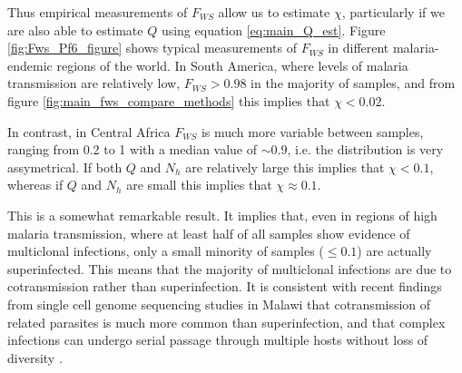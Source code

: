 \documentclass[_main.tex]{subfiles}
\begin{document}
Thus empirical measurements of $F_{WS}$ allow us to estimate $\chi$, particularly if we are also able to estimate $Q$ using equation \ref{eq:main_Q_est}.  Figure \ref{fig:Fws_Pf6_figure} shows typical measurements of $F_{WS}$ in different malaria-endemic regions of the world.  In South America, where levels of malaria transmission are relatively low, $F_{WS} > 0.98$ in the majority of samples, and from figure \ref{fig:main_fws_compare_methods} this implies that $\chi < 0.02$.  

In contrast, in Central Africa $F_{WS}$ is much more variable between samples, ranging from 0.2 to 1 with a median value of $\sim 0.9$, i.e. the distribution is very assymetrical.  If both $Q$ and $N_h$ are relatively large this implies that $\chi < 0.1$, whereas if $Q$ and $N_h$ are small this implies that $\chi \approx 0.1$. 

This is a somewhat remarkable result.  It implies that, even in regions of high malaria transmission, where at least half of all samples show evidence of multiclonal infections, only a small minority of samples ($\leq 0.1$) are actually superinfected.   This means that the majority of multiclonal infections are due to cotransmission rather than superinfection.  It is consistent with recent findings from single cell genome sequencing studies in Malawi that cotransmission of related parasites is much more common than superinfection, and that complex infections can undergo serial passage through multiple hosts without loss of diversity \cite{Nkhoma2020}.
\end{document}
